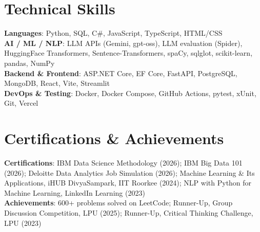 \documentclass[letterpaper,10.5pt]{article}
\begin{document}
\section{Technical Skills}
 \begin{itemize}[leftmargin=0.15in, label={}]
    \small{\item{
     \textbf{Languages}{: Python, SQL, C\#, JavaScript, TypeScript, HTML/CSS} \\
     \textbf{AI / ML / NLP}{: LLM APIs (Gemini, gpt-oss), LLM evaluation (Spider), HuggingFace Transformers, Sentence-Transformers, spaCy, sqlglot, scikit-learn, pandas, NumPy} \\
     \textbf{Backend \& Frontend}{: ASP.NET Core, EF Core, FastAPI, PostgreSQL, MongoDB, React, Vite, Streamlit} \\
     \textbf{DevOps \& Testing}{: Docker, Docker Compose, GitHub Actions, pytest, xUnit, Git, Vercel}
    }}
 \end{itemize}
 \vspace{-12pt}

\section{Certifications \& Achievements}
 \begin{itemize}[leftmargin=0.15in, label={}]
    \small{\item{
     \textbf{Certifications}{: IBM Data Science Methodology (2026); IBM Big Data 101 (2026); Deloitte Data Analytics Job Simulation (2026); Machine Learning \& Its Applications, iHUB DivyaSampark, IIT Roorkee (2024); NLP with Python for Machine Learning, LinkedIn Learning (2023)} \\
     \textbf{Achievements}{: 600+ problems solved on LeetCode; Runner-Up, Group Discussion Competition, LPU (2025); Runner-Up, Critical Thinking Challenge, LPU (2023)}
    }}
 \end{itemize}
\end{document}
